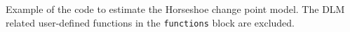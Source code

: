 Example of the code to estimate the Horseshoe change point model.
The DLM related user-defined functions in the \texttt{functions} block are excluded.


\inputminted[firstline=5,style=bw]{stan}{../dlm-shrinkage/stan/changepoint_horseshoe.stan.mustache}  


